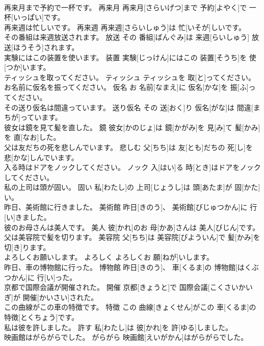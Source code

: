 \documentclass[8pt]{extreport}
\begin{document}
\begin{CJK}{UTF8}{min}
\\	再来月まで予約で一杯です。	再来月	再来月[さらいげつ]まで 予約[よやく]で 一杯[いっぱい]です。	
\\	再来週は忙しいです。	再来週	再来週[さらいしゅう]は 忙[いそが]しいです。	
\\	その番組は来週放送されます。	放送	その 番組[ばんぐみ]は 来週[らいしゅう] 放送[ほうそう]されます。	
\\	実験にはこの装置を使います。	装置	実験[じっけん]にはこの 装置[そうち]を 使[つか]います。	
\\	ティッシュを取ってください。	ティッシュ	ティッシュを 取[と]ってください。	
\\	お名前に仮名を振ってください。	仮名	お 名前[なまえ]に 仮名[かな]を 振[ふ]ってください。	
\\	その送り仮名は間違っています。	送り仮名	その 送[おく]り 仮名[がな]は 間違[まちが]っています。	
\\	彼女は鏡を見て髪を直した。	鏡	彼女[かのじょ]は 鏡[かがみ]を 見[み]て 髪[かみ]を 直[なお]した。	
\\	父は友だちの死を悲しんでいます。	悲しむ	父[ちち]は 友[とも]だちの 死[し]を 悲[かな]しんでいます。	
\\	入る時はドアをノックしてください。	ノック	入[はい]る 時[とき]はドアをノックしてください。	
\\	私の上司は頭が固い。	固い	私[わたし]の 上司[じょうし]は 頭[あたま]が 固[かた]い。	
\\	昨日、美術館に行きました。	美術館	昨日[きのう]、 美術館[びじゅつかん]に 行[い]きました。	
\\	彼のお母さんは美人です。	美人	彼[かれ]のお 母[かあ]さんは 美人[びじん]です。	
\\	父は美容院で髪を切ります。	美容院	父[ちち]は 美容院[びよういん]で 髪[かみ]を 切[き]ります。	
\\	よろしくお願いします。	よろしく	よろしくお 願[ねが]いします。	
\\	昨日、車の博物館に行った。	博物館	昨日[きのう]、 車[くるま]の 博物館[はくぶつかん]に 行[い]った。	
\\	京都で国際会議が開催された。	開催	京都[きょうと]で 国際会議[こくさいかいぎ]が 開催[かいさい]された。	
\\	この曲線がこの車の特徴です。	特徴	この 曲線[きょくせん]がこの 車[くるま]の 特徴[とくちょう]です。	
\\	私は彼を許しました。	許す	私[わたし]は 彼[かれ]を 許[ゆる]しました。	
\\	映画館はがらがらでした。	がらがら	映画館[えいがかん]はがらがらでした。	

\end{CJK}
\end{document}
